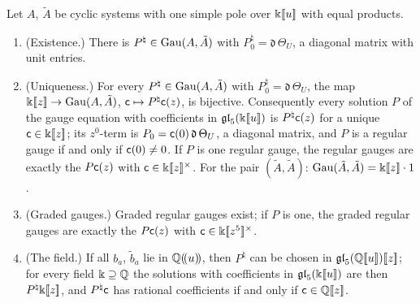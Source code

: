 \begin{thm}[Theorem U]
\label{thm:gau-U}
Let $A$, $\tilde A$ be cyclic systems with one simple pole over $\Bbbk[\![ u ]\!]$ with equal products.
\begin{enumerate}
\item[(a)] (Existence.) There is $P^\natural\in\operatorname{Gau}(A,\tilde A)$ with $P^\natural_0=\mathfrak d\,\Theta_U$, a diagonal matrix with unit entries.
\item[(b)] (Uniqueness.) For every $P^\natural\in\operatorname{Gau}(A,\tilde A)$ with $P^\natural_0=\mathfrak d\,\Theta_U$, the map $\Bbbk[\![ z ]\!]\to\operatorname{Gau}(A,\tilde A)$, $\mathsf{c}\mapsto P^\natural\mathsf{c}(z)$, is bijective. Consequently every solution $P$ of the gauge equation with coefficients in $\mathfrak{gl}_5(\Bbbk[\![ u ]\!])$ is $P^\natural\mathsf{c}(z)$ for a unique $\mathsf{c}\in\Bbbk[\![ z ]\!]$; its $z^0$-term is $P_0=\mathsf{c}(0)\,\mathfrak d\,\Theta_U$, a diagonal matrix, and $P$ is a regular gauge if and only if $\mathsf{c}(0)\neq0$. If $P$ is one regular gauge, the regular gauges are exactly the $P\mathsf{c}(z)$ with $\mathsf{c}\in\Bbbk[\![ z ]\!]^\times$. For the pair $(\tilde A,\tilde A)$: $\operatorname{Gau}(\tilde A,\tilde A)=\Bbbk[\![ z ]\!]\cdot1$.
\item[(c)] (Graded gauges.) Graded regular gauges exist; if $P$ is one, the graded regular gauges are exactly the $P\mathsf{c}(z)$ with $\mathsf{c}\in\Bbbk[\![ z^5 ]\!]^\times$.
\item[(d)] (The field.) If all $b_a$, $\tilde b_a$ lie in $\mathbb{Q}(\!(u)\!)$, then $P^\natural$ can be chosen in $\mathfrak{gl}_5(\mathbb{Q}[\![ u ]\!])[\![ z ]\!]$; for every field $\Bbbk\supseteq\mathbb{Q}$ the solutions with coefficients in $\mathfrak{gl}_5(\Bbbk[\![ u ]\!])$ are then $P^\natural\Bbbk[\![ z ]\!]$, and $P^\natural\mathsf{c}$ has rational coefficients if and only if $\mathsf{c}\in\mathbb{Q}[\![ z ]\!]$.
\end{enumerate}
\end{thm}


